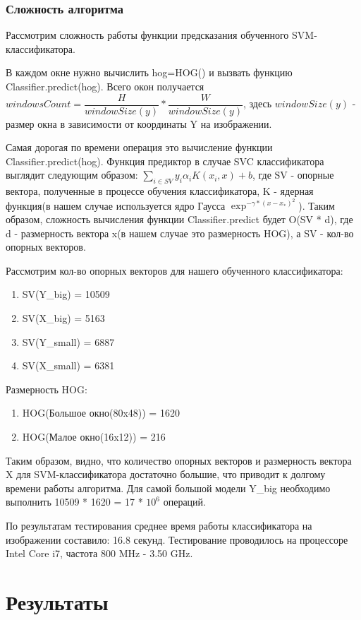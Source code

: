 \subsection{Сложность алгоритма}
Рассмотрим сложность работы функции предсказания обученного SVM-классификатора.

В каждом окне нужно вычислить hog=HOG() и вызвать функцию Classifier.predict(hog). Всего окон получается $windowsCount = \dfrac{H}{windowSize(y)} * \dfrac{W}{windowSize(y)}$, здесь $windowSize(y)$ - размер окна в зависимости от координаты Y на изображении.

Самая дорогая по времени операция это вычисление функции Classifier.predict(hog).  Функция предиктор в случае SVC классификатора выглядит следующим образом: $\sum_{i \in SV} y_i\alpha_i K(x_i, x) + b$, где SV - опорные вектора, полученные в процессе обучения классификатора, K - ядерная функция(в нашем случае используется ядро Гаусса $\exp^{-\gamma*(x-x_*)^2}$). Таким образом, сложность вычисления функции Classifier.predict будет O(SV * d), где d - размерность вектора x(в нашем случае это размерность HOG), а SV - кол-во опорных векторов. 

Рассмотрим кол-во опорных векторов для нашего обученного классификатора:
\begin{enumerate}
	\item SV(Y\_big) = 10509
	\item SV(X\_big) = 5163
	\item SV(Y\_small) = 6887
	\item SV(X\_small) = 6381
\end{enumerate}

Размерность HOG:
\begin{enumerate}
	\item HOG(Большое окно(80x48)) = 1620
	\item HOG(Малое окно(16x12)) = 216
\end{enumerate}

Таким образом, видно, что количество опорных векторов и размерность вектора X для SVM-классификатора достаточно большие, что приводит к долгому времени работы алгоритма.
Для самой большой модели Y\_big необходимо выполнить 10509 * 1620 = 17 * $10^6$ операций.

По результатам тестирования среднее время работы классификатора на изображении составило: 16.8 секунд. Тестирование проводилось на процессоре Intel Core i7, частота 800 MHz - 3.50 GHz.

\newpage
\chapter{Результаты}

